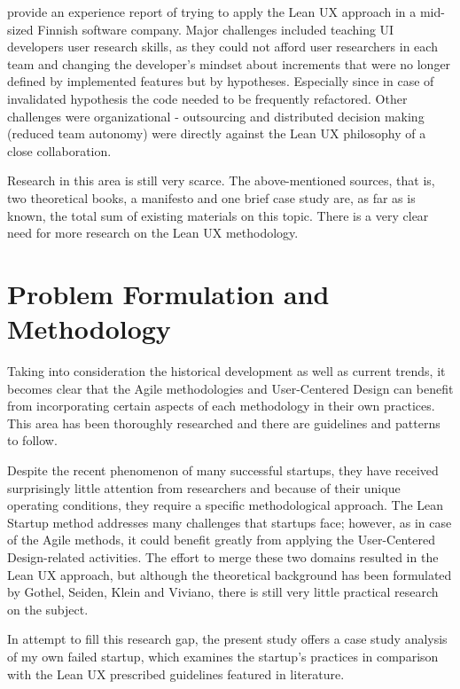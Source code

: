 \documentclass{article}
\begin{document}
\cite{liikkanen2014lean} provide an experience report of trying to apply the Lean UX approach in a mid-sized Finnish software company. Major challenges included teaching UI developers user research skills, as they could not afford user researchers in each team and changing the developer's mindset about increments that were no longer defined by implemented features but by hypotheses. Especially since in case of invalidated hypothesis the code needed to be frequently refactored. Other challenges were organizational - outsourcing and distributed decision making (reduced team autonomy) were directly against the Lean UX philosophy of a close collaboration.

Research in this area is still very scarce. The above-mentioned sources, that is, two theoretical books, a manifesto and one brief case study are, as far as is known, the total sum of existing materials on this topic. There is a very clear need for more research on the Lean UX methodology.

\section{Problem Formulation and Methodology}
\label{sec:probl-form-meth}
Taking into consideration the historical development as well as current trends, it becomes clear that the Agile methodologies and User-Centered Design can benefit from incorporating certain aspects of each methodology in their own practices. This area has been thoroughly researched and there are guidelines and patterns to follow.

Despite the recent phenomenon of many successful startups, they have received surprisingly little attention from researchers and because of their unique operating conditions, they require a specific methodological approach. The Lean Startup method addresses many challenges that startups face; however, as in case of the Agile methods, it could benefit greatly from applying the User-Centered Design-related activities. The effort to merge these two domains resulted in the Lean UX approach, but although the theoretical background has been formulated by Gothel, Seiden, Klein and Viviano, there is still very little practical research on the subject.

In attempt to fill this research gap, the present study offers a case study analysis of my own failed startup, which examines the startup's practices in comparison with the Lean UX prescribed guidelines featured in literature.
\end{document}
